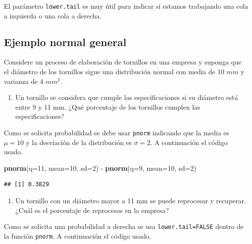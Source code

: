 \documentclass[10pt,]{krantz}
\makeatletter
\newenvironment{Shaded}{\begin{snugshade}}{\end{snugshade}}
\newcommand{\KeywordTok}[1]{\textcolor[rgb]{0.13,0.29,0.53}{\textbf{{#1}}}}
\newcommand{\DataTypeTok}[1]{\textcolor[rgb]{0.13,0.29,0.53}{{#1}}}
\newcommand{\DecValTok}[1]{\textcolor[rgb]{0.00,0.00,0.81}{{#1}}}
\newcommand{\StringTok}[1]{\textcolor[rgb]{0.31,0.60,0.02}{{#1}}}
\newcommand{\NormalTok}[1]{{#1}}
\providecommand{\tightlist}{%
  \setlength{\itemsep}{0pt}\setlength{\parskip}{0pt}}
\newenvironment{kframe}{%
\medskip{}
\setlength{\fboxsep}{.8em}
 \def\at@end@of@kframe{}%
 \ifinner\ifhmode%
  \def\at@end@of@kframe{\end{minipage}}%
  \begin{minipage}{\columnwidth}%
 \fi\fi%
 \def\FrameCommand##1{\hskip\@totalleftmargin \hskip-\fboxsep
 \colorbox{shadecolor}{##1}\hskip-\fboxsep
     \hskip-\linewidth \hskip-\@totalleftmargin \hskip\columnwidth}%
 \MakeFramed {\advance\hsize-\width
   \@totalleftmargin\z@ \linewidth\hsize
   \@setminipage}}%
 {\par\unskip\endMakeFramed%
 \at@end@of@kframe}
\renewenvironment{Shaded}{\begin{kframe}}{\end{kframe}}
\let\BeginKnitrBlock\begin \let\EndKnitrBlock\end
\makeatother
\begin{document}
\BeginKnitrBlock{rmdtip}
El parámetro \texttt{lower.tail} es muy útil para indicar si estamos
trabajando una cola a izquierda o una cola a derecha.
\EndKnitrBlock{rmdtip}

\subsection*{Ejemplo normal general}\label{ejemplo-normal-general}


Considere un proceso de elaboración de tornillos en una empresa y
suponga que el diámetro de los tornillos sigue una distribución normal
con media de 10 \(mm\) y varianza de 4 \(mm^2\).

\begin{enumerate}
\def\labelenumi{\arabic{enumi})}
\tightlist
\item
  Un tornillo se considera que cumple las especificaciones si su
  diámetro está entre 9 y 11 mm. ¿Qué porcentaje de los tornillos
  cumplen las especificaciones?
\end{enumerate}

Como se solicita probabilidad se debe usar \texttt{pnorm} indicando que
la media es \(\mu=10\) y la desviación de la distribución es
\(\sigma=2\). A continuación el código usado.

\begin{Shaded}
\begin{Highlighting}[]
\KeywordTok{pnorm}\NormalTok{(}\DataTypeTok{q=}\DecValTok{11}\NormalTok{, }\DataTypeTok{mean=}\DecValTok{10}\NormalTok{, }\DataTypeTok{sd=}\DecValTok{2}\NormalTok{) -}\StringTok{ }\KeywordTok{pnorm}\NormalTok{(}\DataTypeTok{q=}\DecValTok{9}\NormalTok{, }\DataTypeTok{mean=}\DecValTok{10}\NormalTok{, }\DataTypeTok{sd=}\DecValTok{2}\NormalTok{)}
\end{Highlighting}
\end{Shaded}

\begin{verbatim}
## [1] 0.3829
\end{verbatim}

\begin{enumerate}
\def\labelenumi{\arabic{enumi})}
\setcounter{enumi}{1}
\tightlist
\item
  Un tornillo con un diámetro mayor a 11 mm se puede reprocesar y
  recuperar. ¿Cuál es el porcentaje de reprocesos en la empresa?
\end{enumerate}

Como se solicita una probabilidad a derecha se usa
\texttt{lower.tail=FALSE} dentro de la función \texttt{pnorm}. A
continuación el código usado.
\end{document}
